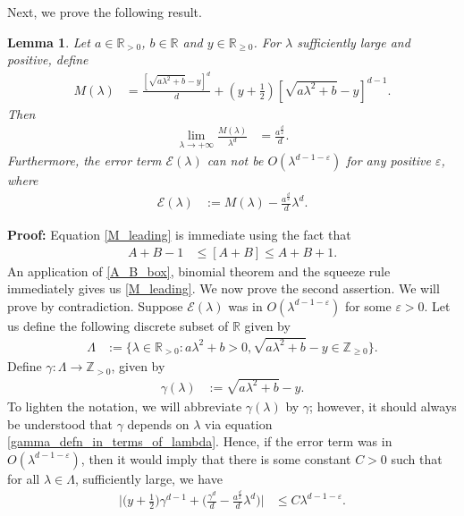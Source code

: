 \documentclass[10pt,a4paper]{amsart}
\newtheorem{lmm}{Lemma}
\begin{document}
Next, we prove the following result. 
\begin{lmm}
\label{sharp_main}
Let $a \in \mathbb{R}_{>0}$, $b\in \mathbb{R}$ and $y \in \mathbb{R}_{\geq 0}$. For $\lambda$ 
sufficiently large and positive, define 
\begin{align*}
M(\lambda)& = \frac{[\sqrt{a\lambda^2+b}-y]^d}{d} + (y+\frac{1}{2})[\sqrt{a\lambda^2+b}-y]^{d-1}.
\end{align*}
Then
\begin{align}
\lim_{\lambda\longrightarrow +\infty} \frac{M(\lambda)}{\lambda^d} & = \frac{a^{\frac{d}{2}}}{d}. 
\label{M_leading}
\end{align}
Furthermore, the error term $\mathcal{E}(\lambda)$ can not be $O(\lambda^{d-1-\varepsilon})$ 
for any positive $\varepsilon$, where 
\begin{align*}
\mathcal{E}(\lambda) &:= M(\lambda)-\frac{a^{\frac{d}{2}}}{d} \lambda^d.
\end{align*}
\end{lmm} 
\noindent \textbf{Proof:} Equation \eqref{M_leading} is immediate using the fact that 
\begin{align} 
A+B-1&\leq [A+B]\leq A+B+1. \label{A_B_box}
\end{align}
An application of \eqref{A_B_box}, binomial theorem 
and the squeeze rule immediately gives us \eqref{M_leading}.  
We now prove the second assertion. We will prove by contradiction. Suppose 
$\mathcal{E}(\lambda)$ was in $O(\lambda^{d-1-\varepsilon})$ for some $\varepsilon>0$. 
Let us define the following discrete subset of $\mathbb{R}$ given by 
\begin{align*}
\Lambda&:= \Big\{ \lambda\in \mathbb{R}_{>0}: a \lambda^2+b>0, \sqrt{a\lambda^2+b}-y \in \mathbb{Z}_{\geq 0}
\Big\}.
\end{align*}
Define $\gamma:\Lambda\longrightarrow \mathbb{Z}_{>0}$, given by 
\begin{align} 
\gamma(\lambda)&:= \sqrt{a\lambda^2+b}-y. \label{gamma_defn_in_terms_of_lambda} 
\end{align}
To lighten the notation, 
we will abbreviate $\gamma(\lambda)$ by $\gamma$; however, it should always 
be understood that $\gamma$ depends on $\lambda$ via equation \eqref{gamma_defn_in_terms_of_lambda}. 
Hence, if the error term was in $O(\lambda^{d-1-\varepsilon})$, then it would imply that there is some constant 
$C>0$ such that for all $\lambda \in \Lambda$, sufficiently large, we have 
\begin{align}
\Big| \Big(y+\frac{1}{2}\Big) \gamma^{d-1} 
+\Big(\frac{\gamma^d}{d}-\frac{a^{\frac{d}{2}}}{d} \lambda^d\Big) \Big| & \leq C \lambda^{d-1-\varepsilon}. \label{lm_gmm_contrd}
\end{align} 
\end{document}
